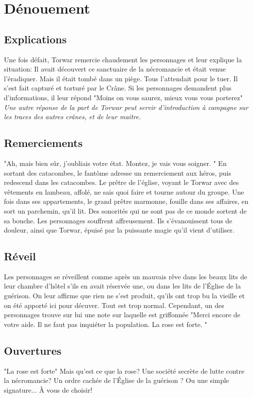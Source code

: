 \documentclass[a4paper]{article}
\begin{document}
\section{Dénouement} 
\subsection{Explications}
Une fois défait, Torwar remercie chaudement les personnages et leur explique la situation: Il avait découvert ce sanctuaire de la nécromancie et était venue l'éradiquer. Mais il était tombé dans un piège. Tous l'attendait pour le tuer. Il s'est fait capturé et torturé par le Crâne. Si les personnages demandent plus d'informations, il leur répond "Moins on vous saurez, mieux vous vous porterez" \textit{Une autre réponse de la part de Torwar peut servir d'introduction à campagne sur les traces des autres crânes, et de leur maitre.}

\subsection{Remerciements}
"Ah, mais bien sûr, j’oubliais votre état. Montez, je vais vous soigner. " En sortant des catacombes, le fantôme adresse un remerciement aux héros, puis redescend dans les catacombes.
Le prêtre de l'église, voyant le Torwar avec des vêtements en lambeau, affolé, ne sais quoi faire et tourne autour du groupe. Une fois dans ses appartements, le grand prêtre marmonne, fouille dans ses affaires, en sort un parchemin, qu'il lit. Des sonorités qui ne sont pas de ce monde sortent de sa bouche. Les personnages souffrent affreusement. Ils s’évanouissent tous de douleur, ainsi que Torwar, épuisé par la puissante magie qu'il vient d'utiliser. 

\subsection{Réveil}
Les personnages se réveillent comme après un mauvais rêve dans les beaux lits de leur chambre d'hôtel s'ils en avait réservée une, ou dans les lits de l’Église de la guérison. On leur affirme que rien ne s'est produit, qu'ils ont trop bu la vieille et on été apporté ici pour décuver. Tout est trop normal.
\newline
Cependant, un des personnages trouve sur lui une note sur laquelle est griffonnée "Merci encore de votre aide. Il ne faut pas inquiéter la population. La rose est forte. "

\subsection{Ouvertures}
"La rose est forte" Mais qu'est ce que la rose? Une société secrète de lutte contre la nécromancie? Un ordre cachée de l'Église de la guérison ? Ou une simple signature... À vous de choisir!
\end{document}
